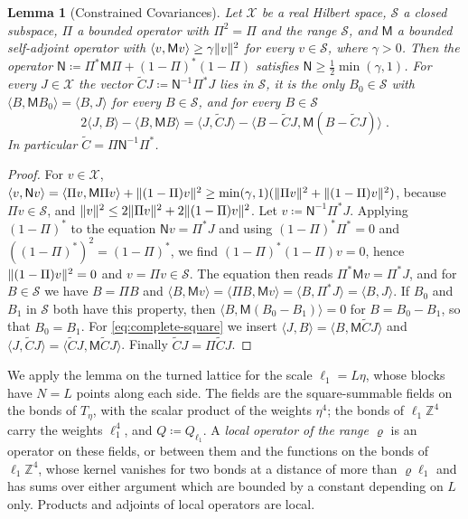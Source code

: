 \documentclass[11pt]{preprint}
\DeclarePairedDelimiter{\norm}{\lVert}{\rVert}
\numberwithin{equation}{section}
\newtheorem{lemma}[theorem]{Lemma}
\theoremstyle{definition}
\theoremstyle{remark}
\theoremstyle{plain}
\begin{document}
\begin{lemma}[Constrained Covariances]\label{lem:constrained-covariance}
Let $\mathcal X$ be a real Hilbert space, $\mathcal S$ a closed subspace, $\Pi$ a bounded operator with $\Pi^2 = \Pi$ and the range $\mathcal S$, and $\mathsf M$ a bounded self-adjoint operator with $\langle v, \mathsf Mv\rangle \geq \gamma\norm v^2$ for every $v \in \mathcal S$, where $\gamma > 0$. Then the operator $\mathsf N \coloneqq \Pi^*\mathsf M\Pi + (1 - \Pi)^*(1 - \Pi)$ satisfies $\mathsf N \geq \frac12\min(\gamma, 1)$. For every $J \in \mathcal X$ the vector $\tilde CJ \coloneqq \mathsf N^{-1}\Pi^*J$ lies in $\mathcal S$, it is the only $B_0 \in \mathcal S$ with $\langle B, \mathsf MB_0\rangle = \langle B, J\rangle$ for every $B \in \mathcal S$, and for every $B \in \mathcal S$
\begin{equation}\label{eq:complete-square}
    2\langle J, B\rangle - \langle B, \mathsf MB\rangle = \langle J, \tilde CJ\rangle - \langle B - \tilde CJ, \mathsf M(B - \tilde CJ)\rangle\;.
\end{equation}
In particular $\tilde C = \Pi\mathsf N^{-1}\Pi^*$.
\end{lemma}

\begin{proof}
For $v \in \mathcal X$, $\langle v, \mathsf Nv\rangle = \langle\Pi v, \mathsf M\Pi v\rangle + \norm{(1 - \Pi)v}^2 \geq \min(\gamma, 1)(\norm{\Pi v}^2 + \norm{(1 - \Pi)v}^2)$, because $\Pi v \in \mathcal S$, and $\norm v^2 \leq 2\norm{\Pi v}^2 + 2\norm{(1 - \Pi)v}^2$. Let $v \coloneqq \mathsf N^{-1}\Pi^*J$. Applying $(1 - \Pi)^*$ to the equation $\mathsf Nv = \Pi^*J$ and using $(1 - \Pi)^*\Pi^* = 0$ and $((1 - \Pi)^*)^2 = (1 - \Pi)^*$, we find $(1 - \Pi)^*(1 - \Pi)v = 0$, hence $\norm{(1 - \Pi)v}^2 = 0$ and $v = \Pi v \in \mathcal S$. The equation then reads $\Pi^*\mathsf Mv = \Pi^*J$, and for $B \in \mathcal S$ we have $B = \Pi B$ and $\langle B, \mathsf Mv\rangle = \langle\Pi B, \mathsf Mv\rangle = \langle B, \Pi^*J\rangle = \langle B, J\rangle$. If $B_0$ and $B_1$ in $\mathcal S$ both have this property, then $\langle B, \mathsf M(B_0 - B_1)\rangle = 0$ for $B = B_0 - B_1$, so that $B_0 = B_1$. For \eqref{eq:complete-square} we insert $\langle J, B\rangle = \langle B, \mathsf M\tilde CJ\rangle$ and $\langle J, \tilde CJ\rangle = \langle\tilde CJ, \mathsf M\tilde CJ\rangle$. Finally $\tilde CJ = \Pi\tilde CJ$.
\end{proof}

We apply the lemma on the turned lattice for the scale $\ell_1 = L\eta$, whose blocks have $N = L$ points along each side. The fields are the square-summable fields on the bonds of $T_\eta$, with the scalar product of the weights $\eta^4$; the bonds of $\ell_1\mathbb Z^4$ carry the weights $\ell_1^4$, and $Q \coloneqq Q_{\ell_1}$. A \emph{local operator of the range $\varrho$} is an operator on these fields, or between them and the functions on the bonds of $\ell_1\mathbb Z^4$, whose kernel vanishes for two bonds at a distance of more than $\varrho\ell_1$ and has sums over either argument which are bounded by a constant depending on $L$ only. Products and adjoints of local operators are local.
\end{document}
